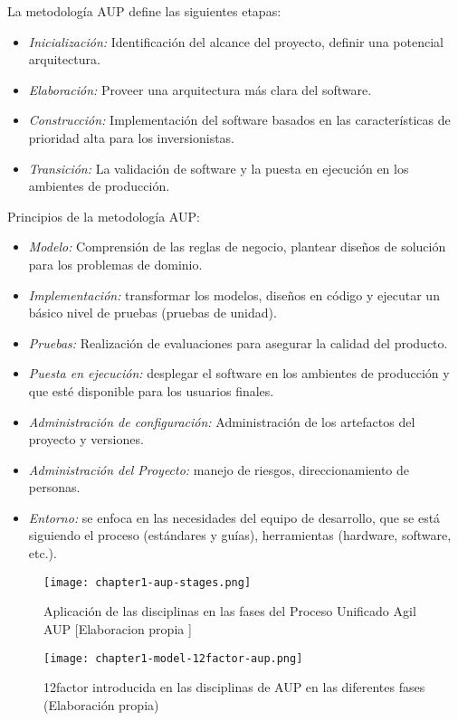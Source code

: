 \noindent La metodología AUP define las siguientes etapas:

\begin{itemize}
  \item \textit{Inicialización:} Identificación del alcance del proyecto, definir una potencial arquitectura.
  \item \textit{Elaboración:} Proveer una arquitectura más clara del software.
  \item \textit{Construcción:} Implementación del software basados en las características de prioridad alta para los inversionistas. 
  \item \textit{Transición:} La validación de software y la puesta en ejecución en los ambientes de producción.
\end{itemize}

\noindent Principios de la metodología AUP:
\begin{itemize}
  \item \textit{Modelo:} Comprensión de las reglas de negocio, plantear diseños de solución para los problemas de dominio.
  \item \textit{Implementación:} transformar los modelos, diseños en código y ejecutar un básico nivel de pruebas (pruebas de unidad).
  \item \textit{Pruebas:} Realización de evaluaciones para asegurar la calidad del producto.
  \item \textit{Puesta en ejecución:} desplegar el software en los ambientes de producción y que esté disponible para los usuarios finales.
  \item \textit{Administración de configuración:} Administración de los artefactos del proyecto y versiones.
  \item \textit{Administración del Proyecto:} manejo de riesgos, direccionamiento de personas.
  \item \textit{Entorno:} se enfoca en las necesidades del equipo de desarrollo, que se está siguiendo el proceso (estándares y guías), herramientas (hardware, software, etc.).
\end{itemize}

\begin{figure}[ht]
  \centering
  \texttt{[image: chapter1-aup-stages.png]}
  \caption{Aplicación de las disciplinas en las fases del Proceso Unificado Agil AUP [Elaboracion propia ]}  
\end{figure}

\begin{figure}[ht]
  \centering
  \texttt{[image: chapter1-model-12factor-aup.png]}
  \caption{12factor introducida en las disciplinas de AUP en las diferentes fases (Elaboración propia)}  
\end{figure}

